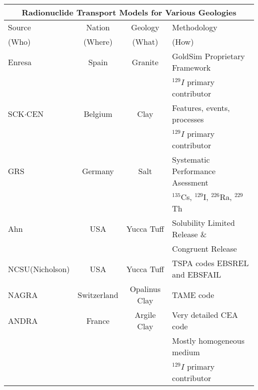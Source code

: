   \begin{table}[h!]
    \centering
    \footnotesize{
    \begin{tabularx}{\textwidth}{|X|c|c|X|}
      \multicolumn{4}{c}{\textbf{Radionuclide Transport Models for Various Geologies}}\\
      \hline
      Source & Nation & Geology & Methodology \\  
      (Who) & (Where) & (What) & (How) \\  
      \hline
      Enresa \cite{von_lensa_red-impact_2008}           & Spain       & Granite                   &  GoldSim Proprietary Framework\\ 
                                                        &             &                           & $^{129}I$ primary contributor \\
      SCK$\cdot$CEN   \cite{von_lensa_red-impact_2008}  & Belgium     & Clay                      & Features, events, processes\\
                                                        &             &                           & $^{129}I$ primary contributor \\
      GRS \cite{von_lensa_red-impact_2008}              & Germany     & Salt                      & Systematic Performance Asessment \\
                                                        &             &                           & $^{135}$Cs, $^{129}$I, $^{226}$Ra, $^{229}$Th \\
      Ahn \cite{ahn_environmental_2004, ahn_environmental_2007} & USA     & Yucca Tuff            & Solubility Limited Release \& \\ 
                                                        &             &                           & Congruent Release  \\
      NCSU(Nicholson) \cite{li_methodology_2006}        & USA         & Yucca Tuff                & TSPA codes EBSREL and EBSFAIL  \\ 
      NAGRA \cite{johnson_project_2002, johnson_calculations_2002}  & Switzerland & Opalinus Clay & TAME code  \\
      ANDRA \cite{andra_argile:_2005}                   & France      & Argile Clay               & Very detailed CEA code  \\
                                                        &             &                           & Mostly homogeneous medium \\
                                                        &             &                           & $^{129}I$ primary contributor \\

\end{tabularx}}
\end{table}
